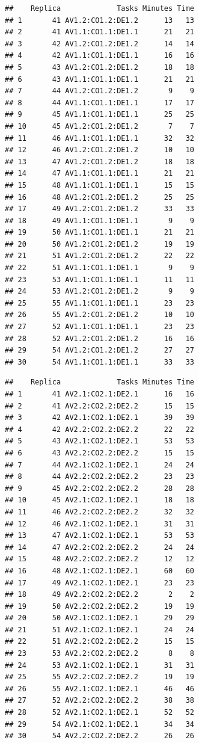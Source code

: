 \documentclass[]{article}
\begin{document}
\begin{verbatim}
##    Replica             Tasks Minutes Time
## 1       41 AV1.2:CO1.2:DE1.2      13   13
## 2       41 AV1.1:CO1.1:DE1.1      21   21
## 3       42 AV1.2:CO1.2:DE1.2      14   14
## 4       42 AV1.1:CO1.1:DE1.1      16   16
## 5       43 AV1.2:CO1.2:DE1.2      18   18
## 6       43 AV1.1:CO1.1:DE1.1      21   21
## 7       44 AV1.2:CO1.2:DE1.2       9    9
## 8       44 AV1.1:CO1.1:DE1.1      17   17
## 9       45 AV1.1:CO1.1:DE1.1      25   25
## 10      45 AV1.2:CO1.2:DE1.2       7    7
## 11      46 AV1.1:CO1.1:DE1.1      32   32
## 12      46 AV1.2:CO1.2:DE1.2      10   10
## 13      47 AV1.2:CO1.2:DE1.2      18   18
## 14      47 AV1.1:CO1.1:DE1.1      21   21
## 15      48 AV1.1:CO1.1:DE1.1      15   15
## 16      48 AV1.2:CO1.2:DE1.2      25   25
## 17      49 AV1.2:CO1.2:DE1.2      33   33
## 18      49 AV1.1:CO1.1:DE1.1       9    9
## 19      50 AV1.1:CO1.1:DE1.1      21   21
## 20      50 AV1.2:CO1.2:DE1.2      19   19
## 21      51 AV1.2:CO1.2:DE1.2      22   22
## 22      51 AV1.1:CO1.1:DE1.1       9    9
## 23      53 AV1.1:CO1.1:DE1.1      11   11
## 24      53 AV1.2:CO1.2:DE1.2       9    9
## 25      55 AV1.1:CO1.1:DE1.1      23   23
## 26      55 AV1.2:CO1.2:DE1.2      10   10
## 27      52 AV1.1:CO1.1:DE1.1      23   23
## 28      52 AV1.2:CO1.2:DE1.2      16   16
## 29      54 AV1.2:CO1.2:DE1.2      27   27
## 30      54 AV1.1:CO1.1:DE1.1      33   33
\end{verbatim}

\begin{verbatim}
##    Replica             Tasks Minutes Time
## 1       41 AV2.1:CO2.1:DE2.1      16   16
## 2       41 AV2.2:CO2.2:DE2.2      15   15
## 3       42 AV2.1:CO2.1:DE2.1      39   39
## 4       42 AV2.2:CO2.2:DE2.2      22   22
## 5       43 AV2.1:CO2.1:DE2.1      53   53
## 6       43 AV2.2:CO2.2:DE2.2      15   15
## 7       44 AV2.1:CO2.1:DE2.1      24   24
## 8       44 AV2.2:CO2.2:DE2.2      23   23
## 9       45 AV2.2:CO2.2:DE2.2      28   28
## 10      45 AV2.1:CO2.1:DE2.1      18   18
## 11      46 AV2.2:CO2.2:DE2.2      32   32
## 12      46 AV2.1:CO2.1:DE2.1      31   31
## 13      47 AV2.1:CO2.1:DE2.1      53   53
## 14      47 AV2.2:CO2.2:DE2.2      24   24
## 15      48 AV2.2:CO2.2:DE2.2      12   12
## 16      48 AV2.1:CO2.1:DE2.1      60   60
## 17      49 AV2.1:CO2.1:DE2.1      23   23
## 18      49 AV2.2:CO2.2:DE2.2       2    2
## 19      50 AV2.2:CO2.2:DE2.2      19   19
## 20      50 AV2.1:CO2.1:DE2.1      29   29
## 21      51 AV2.1:CO2.1:DE2.1      24   24
## 22      51 AV2.2:CO2.2:DE2.2      15   15
## 23      53 AV2.2:CO2.2:DE2.2       8    8
## 24      53 AV2.1:CO2.1:DE2.1      31   31
## 25      55 AV2.2:CO2.2:DE2.2      19   19
## 26      55 AV2.1:CO2.1:DE2.1      46   46
## 27      52 AV2.2:CO2.2:DE2.2      38   38
## 28      52 AV2.1:CO2.1:DE2.1      52   52
## 29      54 AV2.1:CO2.1:DE2.1      34   34
## 30      54 AV2.2:CO2.2:DE2.2      26   26
\end{verbatim}
\end{document}
